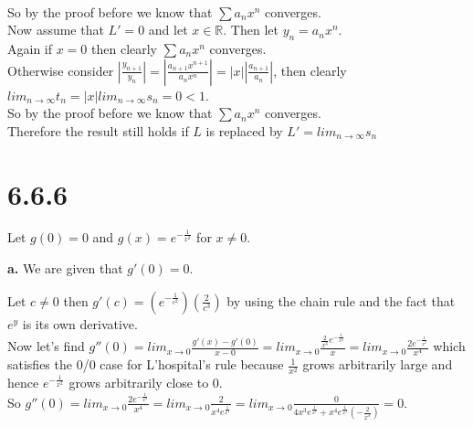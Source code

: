 \documentclass{article}
\begin{document}
\begin{center}
    \\So by the proof before we know that $\sum a_n x^n$ converges.
    \\Now assume that $L' = 0$ and let $x\in\mathbb{R}$. Then let $y_n = a_n x^n$.
    \\Again if $x = 0$ then clearly $\sum a_n x^n$ converges.
     \\Otherwise consider $|\frac{y_{n+1}}{y_n}| = |\frac{a_{n+1} x^{n+1}}{a_n x^n}| = |x||\frac{a_{n+1}}{a_n}|$, then clearly $lim_{n\rightarrow\infty} t_n = |x| lim_{n\rightarrow\infty} s_n = 0 < 1$.
     \\So by the proof before we know that $\sum a_n x^n$ converges.
     \\Therefore the result still holds if $L$ is replaced by $L' = lim_{n\rightarrow\infty} s_n$ \qedsymbol
\end{center}


\newpage
\section*{6.6.6}
\begin{center}
    Let $g(0) = 0$ and $g(x) = e^{-\frac{1}{x^2}}$ for $x\neq 0$.
\end{center}

{\Large\textbf{a.}} We are given that $g'(0) = 0$.
\begin{center}
    \doublespacing
    Let $c\neq 0$ then $g'(c) = (e^{-\frac{1}{c^2}})(\frac{2}{c^3})$ by using the chain rule and the fact that $e^y$ is its own derivative.
    \\Now let's find $g''(0) = lim_{x\rightarrow 0}\frac{g'(x) - g'(0)}{x - 0} = lim_{x\rightarrow 0}\frac{\frac{2}{x^3} e^{-\frac{1}{x^2}}}{x} = lim_{x\rightarrow 0}\frac{2 e^{-\frac{1}{x^2}}}{x^4}$ which satisfies the 0/0 case for L'hospital's rule because $\frac{1}{x^2}$ grows arbitrarily large and hence $e^{-\frac{1}{x^2}}$ grows arbitrarily close to 0.
    \\So $g''(0) = lim_{x\rightarrow 0}\frac{2 e^{-\frac{1}{x^2}}}{x^4} = lim_{x\rightarrow 0}\frac{2}{x^4 e^{\frac{1}{x^2}}} = lim_{x\rightarrow 0}\frac{0}{4 x^3 e^{\frac{1}{x^2}} + x^4 e^{\frac{1}{x^2}} (-\frac{2}{x^3})} = 0$.
\end{center}
\end{document}
